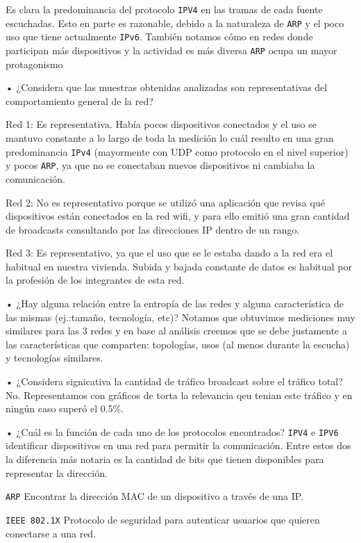 
Es clara la predominancia del protocolo \texttt{IPV4} en las tramas de cada fuente escuchadas. Esto en parte es razonable, debido a la naturaleza de \texttt{ARP} y el poco uso que tiene actualmente \texttt{IPv6}. También notamos cómo en redes donde participan más dispositivos y la actividad es más diversa \texttt{ARP} ocupa un mayor protagonismo 

• ¿Considera que las muestras obtenidas analizadas son representativas del comportamiento general de la red?

Red 1: Es representativa. Había pocos dispositivos conectados y el uso se mantuvo constante a lo largo de toda la medición lo cuál resulto en una gran predominancia \texttt{IPv4} (mayormente con UDP como protocolo en el nivel superior) y pocos \texttt{ARP}, ya que no se conectaban nuevos dispositivos ni cambiaba la comunicación.

Red 2: No es representativo porque se utilizó una aplicación que revisa qué dispositivos están conectados en la red wifi, y para ello emitió una gran cantidad de broadcasts consultando por las direcciones IP dentro de un rango.

Red 3: Es representativo, ya que el uso que se le estaba dando a la red era el habitual en nuestra vivienda. Subida y bajada constante de datos es habitual por la profesión de los integrantes de esta red.

• ¿Hay alguna relación entre la entropía de las redes y alguna característica de las mismas (ej.:tamaño, tecnología, etc)?
Notamos que obtuvimos mediciones muy similares para las 3 redes y en base al análisis creemos que se debe justamente a las características que comparten: topologías, usos (al menos durante la escucha) y tecnologías similares.

• ¿Considera signicativa la cantidad de tráfico broadcast sobre el tráfico total?
No. Representamos con gráficos de torta la relevancia qeu tenian este tráfico y en ningún caso superó el 0.5\%.

• ¿Cuál es la función de cada uno de los protocolos encontrados?
\texttt{IPV4} e \texttt{IPV6} identificar dispositivos en una red para permitir la comunicación. Entre estos dos la diferencia más notaria es la cantidad de bits que tienen disponibles para representar la dirección.

\texttt{ARP} Encontrar la dirección MAC de un dispositivo a través de una IP.

\texttt{IEEE 802.1X} Protocolo de seguridad para autenticar usuarios que quieren conectarse a una red.



